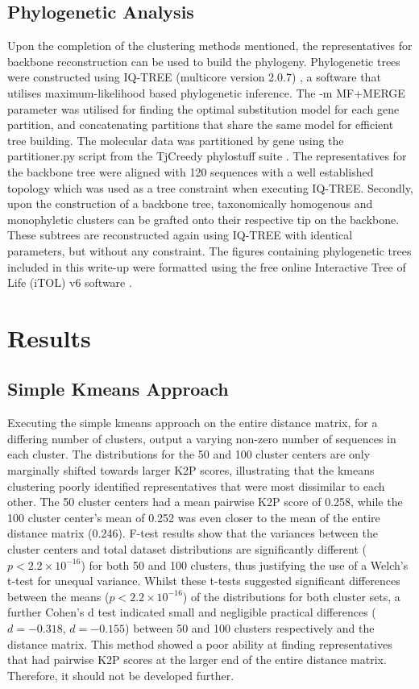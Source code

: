 \documentclass[12pt]{article}
\begin{document}
  \subsection{Phylogenetic Analysis}
  
  Upon the completion of the clustering methods mentioned, the representatives for backbone reconstruction can be used to build the phylogeny. Phylogenetic trees were constructed using IQ-TREE (multicore version 2.0.7) \cite{iqtree}, a software that utilises maximum-likelihood based phylogenetic inference. The -m MF+MERGE parameter was utilised for finding the optimal substitution model for each gene partition, and concatenating partitions that share the same model for efficient tree building. The molecular data was partitioned by gene using the partitioner.py script from the TjCreedy phylostuff suite \cite{Tjcreedy}. The representatives for the backbone tree were aligned with 120 sequences with a well established topology which was used as a tree constraint when executing IQ-TREE. Secondly, upon the construction of a backbone tree, taxonomically homogenous and monophyletic clusters can be grafted onto their respective tip on the backbone. These subtrees are reconstructed again using IQ-TREE with identical parameters, but without any constraint. The figures containing phylogenetic trees included in this write-up were formatted using the free online Interactive Tree of Life (iTOL) v6 software \cite{Letunic2024}.

  \section{Results}

  \subsection{Simple Kmeans Approach}

  Executing the simple kmeans approach on the entire distance matrix, for a differing number of clusters, output a varying non-zero number of sequences in each cluster. The distributions for the 50 and 100 cluster centers are only marginally shifted towards larger K2P scores, illustrating that the kmeans clustering poorly identified representatives that were most dissimilar to each other. The 50 cluster centers had a mean pairwise K2P score of 0.258, while the 100 cluster center's mean of 0.252 was even closer to the mean of the entire distance matrix (0.246). F-test results show that the variances between the cluster centers and total dataset distributions are significantly different ($p < 2.2 \times 10^{-16}$) for both 50 and 100 clusters, thus justifying the use of a Welch's t-test for unequal variance. Whilst these t-tests suggested significant differences between the means ($p < 2.2 \times 10^{-16}$) of the distributions for both cluster sets, a further Cohen's d test indicated small and negligible practical differences ($d = -0.318$, $d = -0.155$) between 50 and 100 clusters respectively and the distance matrix. This method showed a poor ability at finding representatives that had pairwise K2P scores at the larger end of the entire distance matrix. Therefore, it should not be developed further.
\end{document}
